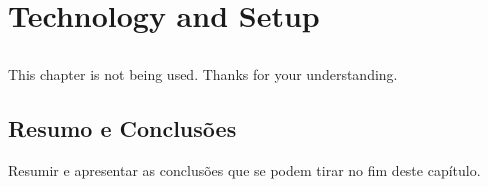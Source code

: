 \chapter{Technology and Setup}
\label{chap:technology}

\section*{}
This chapter is not being used. Thanks for your understanding.


\section{Resumo e Conclusões}

Resumir e apresentar as conclusões que se podem tirar no fim deste
capítulo.
